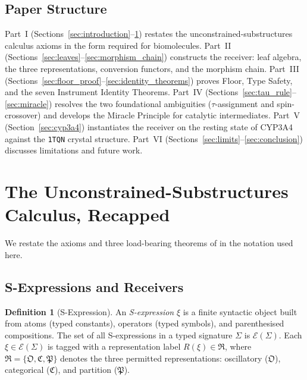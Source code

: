 \documentclass[11pt,twocolumn,a4paper]{article}
\theoremstyle{definition}
\newtheorem{definition}[theorem]{Definition}
\theoremstyle{remark}
\newcommand{\Osc}{\mathfrak{O}}
\newcommand{\Cat}{\mathfrak{C}}
\newcommand{\Part}{\mathfrak{P}}
\newcommand{\Reps}{\mathfrak{R}}
\newcommand{\Sexp}{\xi}
\begin{document}
\subsection{Paper Structure}

Part~I (Sections~\ref{sec:introduction}--\ref{sec:axioms}) restates the unconstrained-substructures calculus axioms in the form required for biomolecules. Part~II (Sections~\ref{sec:leaves}--\ref{sec:morphism_chain}) constructs the receiver: leaf algebra, the three representations, conversion functors, and the morphism chain. Part~III (Sections~\ref{sec:floor_proof}--\ref{sec:identity_theorems}) proves Floor, Type Safety, and the seven Instrument Identity Theorems. Part~IV (Sections~\ref{sec:tau_rule}--\ref{sec:miracle}) resolves the two foundational ambiguities ($\tau$-assignment and spin-crossover) and develops the Miracle Principle for catalytic intermediates. Part~V (Section~\ref{sec:cyp3a4}) instantiates the receiver on the resting state of CYP3A4 against the \texttt{1TQN} crystal structure. Part~VI (Sections~\ref{sec:limits}--\ref{sec:conclusion}) discusses limitations and future work.

\section{The Unconstrained-Substructures Calculus, Recapped}
\label{sec:axioms}

We restate the axioms and three load-bearing theorems of \citet{sachikonye2025unc} in the notation used here.

\subsection{S-Expressions and Receivers}

\begin{definition}[S-Expression]
\label{def:sexp}
An \emph{S-expression} $\Sexp$ is a finite syntactic object built from atoms (typed constants), operators (typed symbols), and parenthesised compositions. The set of all S-expressions in a typed signature $\Sigma$ is $\mathcal{E}(\Sigma)$. Each $\Sexp \in \mathcal{E}(\Sigma)$ is tagged with a representation label $R(\Sexp) \in \Reps$, where $\Reps = \{\Osc, \Cat, \Part\}$ denotes the three permitted representations: oscillatory ($\Osc$), categorical ($\Cat$), and partition ($\Part$).
\end{definition}
\end{document}
